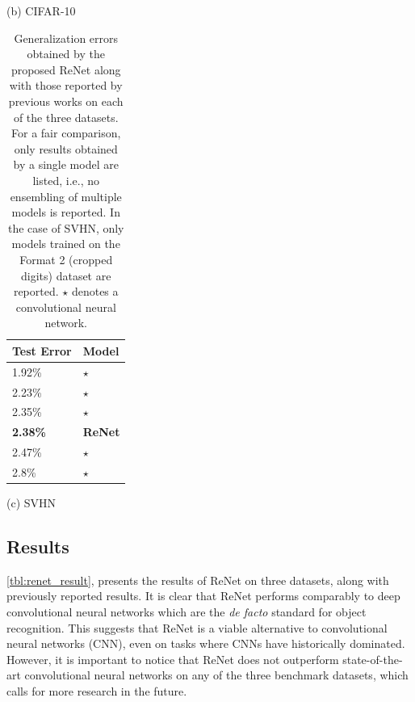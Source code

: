 \begin{table}[t]
\begin{minipage}{0.45\textwidth}
            \vspace{2mm}
            (b) CIFAR-10
        \end{minipage}

        \vspace{4mm}
        \begin{minipage}{0.45\textwidth}
            \centering
            \begin{tabular}{l |  l}
                Test Error & Model  \\
                \hline
    1.92\% & \citep{DBLP:journals/corr/LeeXGZT14}$\star$ \\
    2.23\% & \citep{DBLP:conf/icml/WanZZLF13}$\star$ \\
    2.35\% & \citep{Lin2014}$\star$ \\
    \bf{2.38\%} & \bf{ReNet} \\
    2.47\% & \citep{Goodfellow2013}$\star$ \\
    2.8\% & \citep{DBLP:journals/corr/abs-1301-3557}$\star$ \\
            \end{tabular}

            \vspace{2mm}
            (c) SVHN
        \end{minipage}
        \hfill
        \begin{minipage}{0.51\textwidth}
            \caption{Generalization errors obtained by the proposed ReNet along
                with those reported by previous works on each of the three
                datasets. For a fair comparison, only results obtained by a
                single model are listed, i.e., no ensembling of multiple
                models is reported. In the case of SVHN, only models trained on
                the Format 2 (cropped digits) dataset are reported. $\star$
                denotes a convolutional neural network.}
            \label{tbl:renet_result}
        \end{minipage}
    \end{table}

\subsection{Results}\label{sec:renet_results}

\autoref{tbl:renet_result}, presents the results of ReNet on three datasets,
along with previously reported results. It is clear that ReNet performs
comparably to deep convolutional neural networks which are the {\it de facto}
standard for object recognition. This suggests that ReNet is a viable
alternative to convolutional neural networks (CNN), even on tasks where CNNs
have historically dominated.  However, it is important to notice that ReNet
does not outperform state-of-the-art convolutional neural networks on any of
the three benchmark datasets, which calls for more research in the future.


